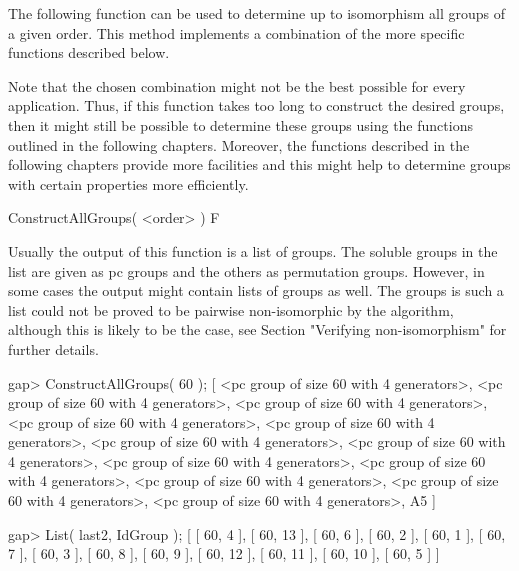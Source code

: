 


The following function can be used to determine up to isomorphism
all groups of a given order. This method implements a combination
of the more specific functions described below.

Note that the chosen combination might not be the best possible for
every application. Thus, if this function takes too long to construct
the desired groups, then it might still be possible to determine these
groups using the functions outlined in the following chapters. Moreover,
the functions described in the following chapters provide more facilities
and this might help to determine groups with certain properties more
efficiently.

\> ConstructAllGroups( <order> ) F

Usually the output of this function is a list of groups. The soluble
groups in the list are given as pc groups and the others as permutation
groups. However, in some cases the output might contain lists of groups
as well. The groups is such a list could not be proved to be pairwise
non-isomorphic by the algorithm, although this is likely to be the case,
see Section "Verifying non-isomorphism" for further details.

\beginexample
gap> ConstructAllGroups( 60 );
[ <pc group of size 60 with 4 generators>, 
  <pc group of size 60 with 4 generators>, 
  <pc group of size 60 with 4 generators>, 
  <pc group of size 60 with 4 generators>, 
  <pc group of size 60 with 4 generators>, 
  <pc group of size 60 with 4 generators>, 
  <pc group of size 60 with 4 generators>, 
  <pc group of size 60 with 4 generators>, 
  <pc group of size 60 with 4 generators>, 
  <pc group of size 60 with 4 generators>, 
  <pc group of size 60 with 4 generators>, 
  <pc group of size 60 with 4 generators>, 
  A5 ]

gap> List( last2, IdGroup );
[ [ 60, 4 ], [ 60, 13 ], [ 60, 6 ], [ 60, 2 ], [ 60, 1 ], [ 60, 7 ], 
  [ 60, 3 ], [ 60, 8 ], [ 60, 9 ], [ 60, 12 ], [ 60, 11 ], [ 60, 10 ], 
  [ 60, 5 ] ]
\endexample

